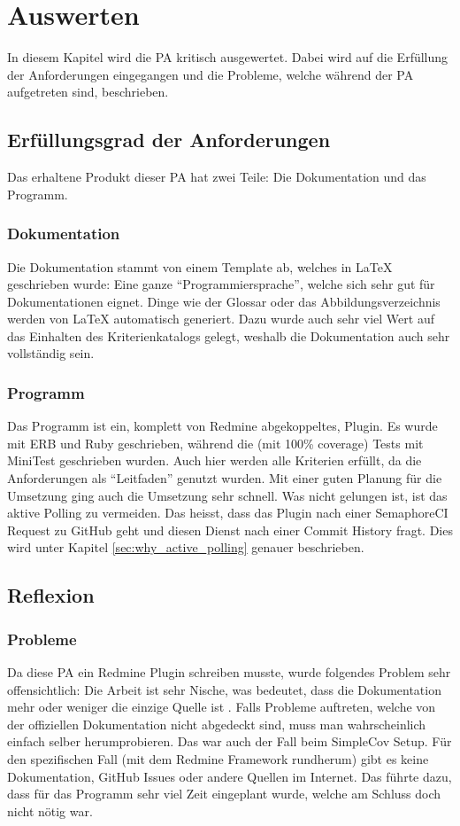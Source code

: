 \chapter{Auswerten}
In diesem Kapitel wird die PA kritisch ausgewertet. Dabei wird auf die Erfüllung der Anforderungen eingegangen
und die Probleme, welche während der PA aufgetreten sind, beschrieben.

\section{Erfüllungsgrad der Anforderungen}
Das erhaltene Produkt dieser PA hat zwei Teile: Die Dokumentation und das Programm.
\subsection{Dokumentation}
Die Dokumentation stammt von einem Template \cite{Buhler_ipa-template_2022} ab, welches in LaTeX geschrieben
wurde: Eine ganze \enquote{Programmiersprache}, welche sich sehr gut für Dokumentationen eignet. Dinge wie der
Glossar oder das Abbildungsverzeichnis werden von LaTeX automatisch generiert. \newline
Dazu wurde auch sehr viel Wert auf das Einhalten des Kriterienkatalogs gelegt, weshalb die Dokumentation auch
sehr vollständig sein.
\subsection{Programm}
Das Programm ist ein, komplett von Redmine abgekoppeltes, Plugin. Es wurde mit ERB und Ruby geschrieben, während
die (mit 100\% coverage) Tests mit MiniTest geschrieben wurden. Auch hier werden alle Kriterien erfüllt, da die
Anforderungen als \enquote{Leitfaden} genutzt wurden. Mit einer guten Planung für die Umsetzung ging auch die
Umsetzung sehr schnell. \newline
Was nicht gelungen ist, ist das aktive Polling zu vermeiden. Das heisst, dass das Plugin nach einer SemaphoreCI
Request zu GitHub geht und diesen Dienst nach einer Commit History fragt. Dies wird unter Kapitel
\ref{sec:why_active_polling} genauer beschrieben.

\section{Reflexion}
\subsection{Probleme}
Da diese PA ein Redmine Plugin schreiben musste, wurde folgendes Problem sehr offensichtlich: Die Arbeit ist
sehr Nische, was bedeutet, dass die Dokumentation mehr oder weniger die einzige Quelle ist
\cite{redmine_plugin_tutorial}. Falls Probleme auftreten, welche von der offiziellen Dokumentation nicht
abgedeckt sind, muss man wahrscheinlich einfach selber herumprobieren. Das war auch der Fall beim SimpleCov
Setup. Für den spezifischen Fall (mit dem Redmine Framework rundherum) gibt es keine Dokumentation, GitHub
Issues oder andere Quellen im Internet. \newline
Das führte dazu, dass für das Programm sehr viel Zeit eingeplant wurde, welche am Schluss doch nicht nötig war.
